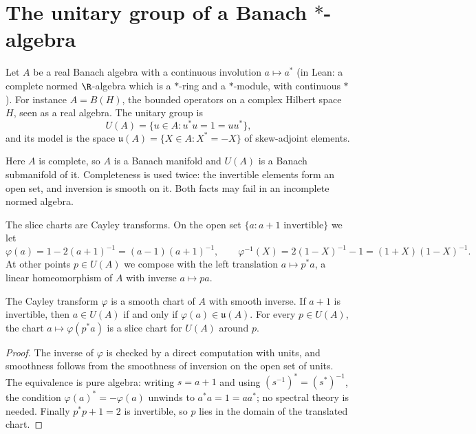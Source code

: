 \section{The unitary group of a Banach \texorpdfstring{$*$}{*}-algebra}

Let $A$ be a real Banach algebra with a continuous involution $a \mapsto a^*$ (in Lean:
a complete normed $\R$-algebra which is a $*$-ring and a $*$-module, with continuous $*$). For
instance $A = B(H)$, the bounded operators on a complex Hilbert space $H$, seen as a real
algebra. The unitary group is
\[
  U(A) = \{u \in A : u^* u = 1 = u u^*\},
\]
and its model is the space $\mathfrak u(A) = \{X \in A : X^* = -X\}$ of skew-adjoint elements.

\begin{remark}[Completeness]
  Here $A$ is complete, so $A$ is a Banach manifold and $U(A)$ is a Banach submanifold of it.
  Completeness is used twice: the invertible elements form an open set, and inversion is smooth
  on it. Both facts may fail in an incomplete normed algebra.
\end{remark}

The slice charts are Cayley transforms. On the open set $\{a : a + 1 \text{ invertible}\}$ we
let
\[
  \varphi(a) = 1 - 2(a + 1)^{-1} = (a - 1)(a + 1)^{-1}, \qquad
  \varphi^{-1}(X) = 2(1 - X)^{-1} - 1 = (1 + X)(1 - X)^{-1}.
\]
At other points $p \in U(A)$ we compose with the left translation $a \mapsto p^* a$, a linear
homeomorphism of $A$ with inverse $a \mapsto pa$.

\begin{lemma}
  \label{lem:ex-cayley}
  \leanok
  The Cayley transform $\varphi$ is a smooth chart of $A$ with smooth inverse. If $a + 1$ is
  invertible, then $a \in U(A)$ if and only if $\varphi(a) \in \mathfrak u(A)$. For every
  $p \in U(A)$, the chart $a \mapsto \varphi(p^* a)$ is a slice chart for $U(A)$ around $p$.
\end{lemma}

\begin{proof}
  \leanok
  The inverse of $\varphi$ is checked by a direct computation with units, and smoothness follows
  from the smoothness of inversion on the open set of units. The equivalence is pure algebra:
  writing $s = a + 1$ and using $(s^{-1})^* = (s^*)^{-1}$, the condition
  $\varphi(a)^* = -\varphi(a)$ unwinds to $a^* a = 1 = a a^*$; no spectral theory is needed.
  Finally $p^* p + 1 = 2$ is invertible, so $p$ lies in the domain of the translated chart.
\end{proof}

